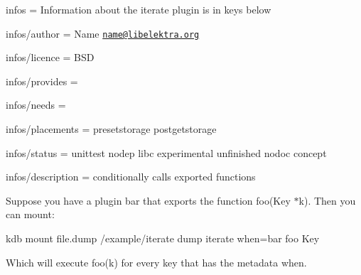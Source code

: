 
\begin{DoxyItemize}
\item infos = Information about the iterate plugin is in keys below
\item infos/author = Name \href{mailto:name@libelektra.org}{\tt name@libelektra.\+org}
\item infos/licence = B\+S\+D
\item infos/provides =
\item infos/needs =
\item infos/placements = presetstorage postgetstorage
\item infos/status = unittest nodep libc experimental unfinished nodoc concept
\item infos/description = conditionally calls exported functions
\end{DoxyItemize}

Suppose you have a plugin bar that exports the function {\ttfamily foo(\+Key $\ast$k)}. Then you can mount\+: \begin{DoxyVerb}kdb mount file.dump /example/iterate dump iterate when=bar foo Key
\end{DoxyVerb}


Which will execute {\ttfamily foo(k)} for every key that has the metadata {\ttfamily when}. 